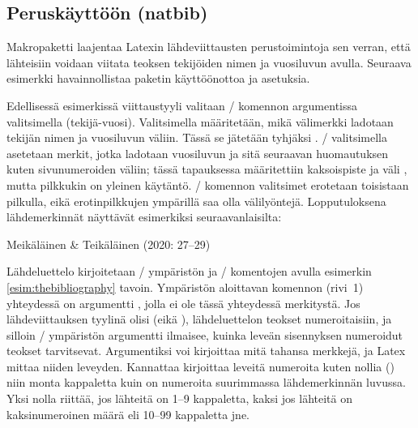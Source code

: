 \subsection{Peruskäyttöön (natbib)}
\label{luku:natbib}

Makropaketti  laajentaa Latexin
lähdeviittausten perustoimintoja sen verran, että lähteisiin voidaan
viitata teoksen tekijöiden nimen ja vuosiluvun avulla. Seuraava
esimerkki havainnollistaa paketin käyttöönottoa ja asetuksia.

\begin{koodilohkosis}
\usepackage{natbib}
\end{koodilohkosis}

Edellisessä esimerkissä viittaustyyli valitaan \-/
komennon argumentissa valitsimella 
(tekijä\--vuosi). Valitsimella  määritetään, mikä
välimerkki ladotaan tekijän nimen ja vuosiluvun väliin. Tässä se
jätetään tyhjäksi \koodi{\{\}}. \-/ valitsimella
asetetaan merkit, jotka ladotaan vuosiluvun ja sitä seuraavan
huomautuksen kuten sivunumeroiden väliin; tässä tapauksessa määritettiin
kaksoispiste ja väli \koodi{\{:~\}}, mutta pilkkukin on yleinen
käytäntö. \-/ komennon valitsimet erotetaan
toisistaan pilkulla, eikä erotinpilkkujen ympärillä saa olla
välilyöntejä. Lopputuloksena lähdemerkinnät näyttävät esimerkiksi
seuraavanlaisilta:

\begin{koodilohkosis}
\citet*[27--29]{johdatus} %
\end{koodilohkosis}

\begin{tulossis}
  Meikäläinen \& Teikäläinen (2020: 27--29)
\end{tulossis}

Lähdeluettelo kirjoitetaan \-/ ympäristön ja
\-/ komentojen avulla esimerkin
\ref{esim:thebibliography} tavoin. Ympäristön aloittavan komennon
(rivi~1) yhteydessä on argumentti , jolla ei ole tässä
yhteydessä merkitystä. Jos lähdeviittauksen tyylinä olisi
 (eikä ), lähdeluettelon teokset
numeroitaisiin, ja silloin \-/ ympäristön
argumentti ilmaisee, kuinka leveän sisennyksen numeroidut teokset
tarvitsevat. Argumentiksi voi kirjoittaa mitä tahansa merkkejä, ja Latex
mittaa niiden leveyden. Kannattaa kirjoittaa leveitä numeroita kuten
nollia () niin monta kappaletta kuin on numeroita suurimmassa
lähdemerkinnän luvussa. Yksi nolla riittää, jos lähteitä on 1--9
kappaletta, kaksi jos lähteitä on kaksinumeroinen määrä eli 10--99
kappaletta jne.


